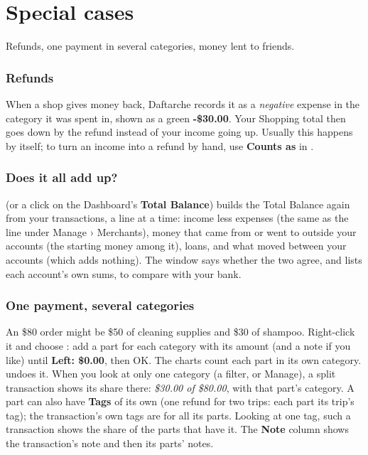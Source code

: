 \documentclass[11pt]{article}
\begin{document}
\chapter{Special cases}{Refunds, one payment in several categories, money lent to friends.}\label{ch:7}

\subsection{Refunds}
When a shop gives money back, Daftarche records it as a \emph{negative} expense in the category it was
spent in, shown as a green \textbf{\color{income}-\$30.00}. Your Shopping total then goes down by the
refund instead of your income going up. Usually this happens by itself; to turn an income into a
refund by hand, use \textbf{Counts as} in .

\subsection{Does it all add up?}
 (or a click on the Dashboard's \textbf{Total Balance}) builds the
Total Balance again from your transactions, a line at a time: income less expenses (the same as
the line under Manage › Merchants), money that came from or went to outside your accounts (the
starting money among it), loans, and what moved between your accounts (which adds nothing). The
window says whether the two agree, and lists each account's own sums, to compare with your bank.

\subsection{One payment, several categories}
An \$80 order might be \$50 of cleaning supplies and \$30 of shampoo. Right-click it and choose
: add a part for each category with its amount (and a note if you like) until
\textbf{Left: \$0.00}, then OK. The charts count each part in its own category. 
undoes it. When you look at only one category (a filter, or Manage), a split transaction shows its
share there: \emph{\$30.00 of \$80.00}, with that part's category. A part can also have
\textbf{Tags} of its own (one refund for two trips: each part its trip's tag); the transaction's
own tags are for all its parts. Looking at one tag, such a transaction shows the share of the parts
that have it. The \textbf{Note} column shows the transaction's note and then its parts' notes.
\end{document}
